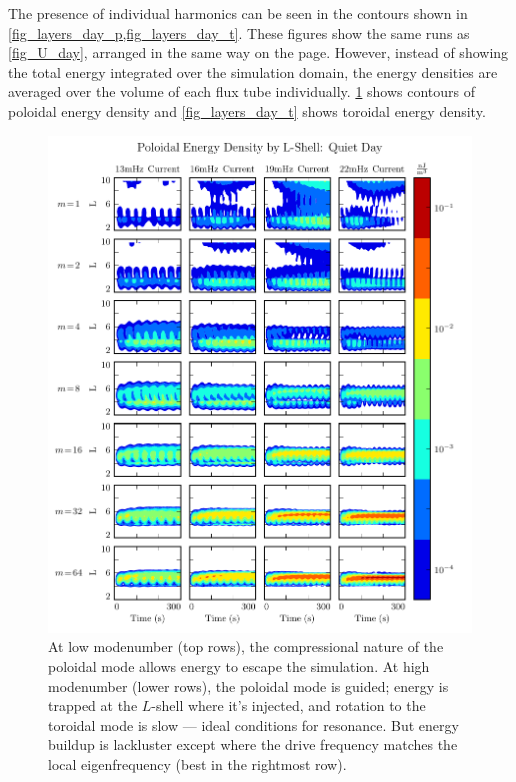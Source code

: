 The presence of individual harmonics can be seen in the contours shown in \cref{fig_layers_day_p,fig_layers_day_t}. These figures show the same runs as \cref{fig_U_day}, arranged in the same way on the page. However, instead of showing the total energy integrated over the simulation domain, the energy densities are averaged over the volume of each flux tube individually. \cref{fig_layers_day_p} shows contours of poloidal energy density and \cref{fig_layers_day_t} shows toroidal energy density. 

\begin{figure}[!htb]
    \centering
    \includegraphics[width=\textwidth]{figures/layers_day_p.pdf}
    \caption[Dayside Poloidal Energy Distribution]{
      At low modenumber (top rows), the compressional nature of the poloidal mode allows energy to escape the simulation. At high modenumber (lower rows), the poloidal mode is guided; energy is trapped at the $L$-shell where it's injected, and rotation to the toroidal mode is slow --- ideal conditions for resonance. But energy buildup is lackluster except where the drive frequency matches the local eigenfrequency (best in the rightmost row). 
    }
    \label{fig_layers_day_p}
\end{figure}

